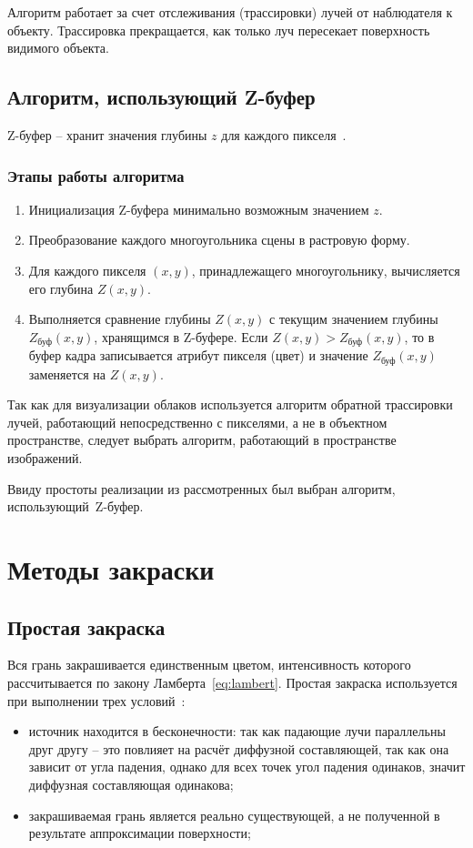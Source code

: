 Алгоритм работает за счет отслеживания (трассировки) лучей от наблюдателя к объекту. Трассировка прекращается, как только луч пересекает поверхность видимого объекта. 

\subsection{Алгоритм, использующий Z-буфер}
Z-буфер -- хранит значения глубины \( z \) для каждого пикселя~\cite{rodgers1989algorithms}.

\subsubsection*{Этапы работы алгоритма}

\begin{enumerate}
	\item Инициализация Z-буфера минимально возможным значением \( z \).
	\item Преобразование каждого многоугольника сцены в растровую форму.
	\item Для каждого пикселя \((x, y)\), принадлежащего многоугольнику, вычисляется его глубина \( Z(x, y) \).
	\item Выполняется сравнение глубины \( Z(x, y) \) с текущим значением глубины \( Z_{\text{буф}}(x, y) \), хранящимся в Z-буфере. Если $Z(x, y) > Z_{\text{буф}}(x, y)$,
	то в буфер кадра записывается атрибут пикселя (цвет) и значение \( Z_{\text{буф}}(x, y) \) заменяется на \( Z(x, y) \).
\end{enumerate}

Так как для визуализации облаков используется алгоритм обратной трассировки лучей, работающий непосредственно с пикселями, а не в объектном пространстве, следует выбрать алгоритм, работающий в пространстве изображений.

Ввиду простоты реализации из рассмотренных был выбран алгоритм, использующий~Z-буфер.

\section{Методы закраски}
\subsection{Простая закраска}

Вся грань закрашивается единственным цветом, интенсивность которого рассчитывается по закону Ламберта~\ref{eq:lambert}. Простая закраска используется при выполнении трех условий~\cite{kurov2024lections}:
\begin{itemize}
	\item источник находится в бесконечности: так как падающие лучи параллельны друг другу -- это повлияет на расчёт диффузной составляющей, так как она зависит от угла падения, однако для всех точек угол падения одинаков, значит диффузная составляющая одинакова;
	\item закрашиваемая грань является реально существующей, а не полученной в результате аппроксимации поверхности;
\end{itemize}

